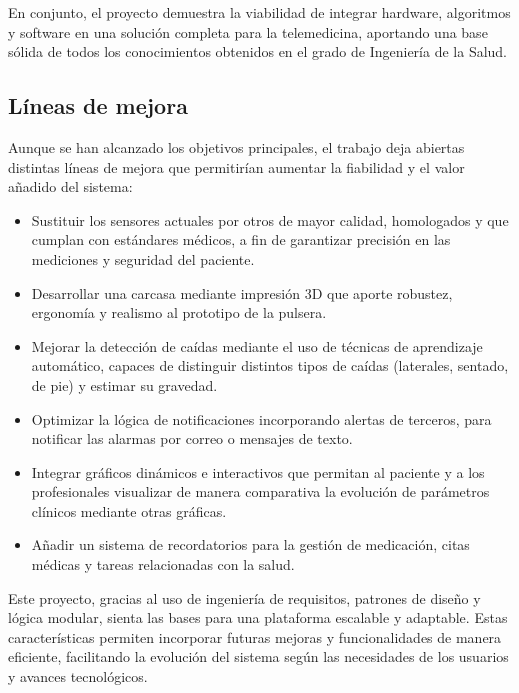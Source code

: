 \documentclass[12pt, a4paper]{article}
\begin{document}
En conjunto, el proyecto demuestra la viabilidad de integrar hardware, algoritmos y software en una solución completa para la telemedicina, aportando una base sólida de todos los conocimientos obtenidos en el grado de Ingeniería de la Salud.

\subsection{Líneas de mejora}

Aunque se han alcanzado los objetivos principales, el trabajo deja abiertas distintas líneas de mejora que permitirían aumentar la fiabilidad y el valor añadido del sistema:

\begin{itemize}
	\item Sustituir los sensores actuales por otros de mayor calidad, homologados y que cumplan con estándares médicos, a fin de garantizar precisión en las mediciones y seguridad del paciente.
	\item Desarrollar una carcasa mediante impresión 3D que aporte robustez, ergonomía y realismo al prototipo de la pulsera.
	\item Mejorar la detección de caídas mediante el uso de técnicas de aprendizaje automático, capaces de distinguir distintos tipos de caídas (laterales, sentado, de pie) y estimar su gravedad.
	\item Optimizar la lógica de notificaciones incorporando alertas de terceros, para notificar las alarmas por correo o mensajes de texto.
	\item Integrar gráficos dinámicos e interactivos que permitan al paciente y a los profesionales visualizar de manera comparativa la evolución de parámetros clínicos mediante otras gráficas.
	\item Añadir un sistema de recordatorios para la gestión de medicación, citas médicas y tareas relacionadas con la salud.
\end{itemize}

Este proyecto, gracias al uso de ingeniería de requisitos, patrones de diseño y lógica modular, sienta las bases para una plataforma escalable y adaptable. Estas características permiten incorporar futuras mejoras y funcionalidades de manera eficiente, facilitando la evolución del sistema según las necesidades de los usuarios y avances tecnológicos.
\end{document}

